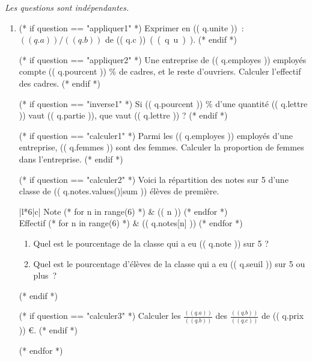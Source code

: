 \exercice

\emph{Les questions sont indépendantes.}

\begin{enumerate}
  (* for question in questions *)
  (* set q=questions[question] *)
  \item %

    (* if question == "appliquer1" *)
    Exprimer en (( q.unite )) : $(( q.a ))/(( q.b ))$ de \SI{(( q.c ))}{(( q.u ))}.
    (* endif *)

    (* if question == "appliquer2" *)
    Une entreprise de (( q.employes )) employés compte (( q.pourcent )) \% de cadres, et le reste d'ouvriers. Calculer l'effectif des cadres.
    (* endif *)

    (* if question == "inverse1" *)
    Si (( q.pourcent )) \% d'une quantité (( q.lettre )) vaut (( q.partie )), que vaut (( q.lettre )) ?
    (* endif *)

    (* if question == "calculer1" *)
    Parmi les (( q.employes )) employés d'une entreprise, (( q.femmes )) sont des femmes. Calculer la proportion de femmes dans l'entreprise.
    (* endif *)

    (* if question == "calculer2" *)
    Voici la répartition des notes sur 5 d'une classe de (( q.notes.values()|sum )) élèves de première.

      \begin{center}\begin{tabular}{|l*{6}{|c}|}
          \hline
          Note (* for n in range(6) *) & (( n )) (* endfor *) \\
          \hline
          Effectif (* for n in range(6) *) & (( q.notes[n] )) (* endfor *) \\
          \hline
      \end{tabular}\end{center}

      \begin{enumerate}
        \item Quel est le pourcentage de la classe qui a eu (( q.note )) sur 5 ?
        \item Quel est le pourcentage d'élèves de la classe qui a eu (( q.seuil )) sur 5 ou plus ?
        \end{enumerate}
    (* endif *)

    (* if question == "calculer3" *)
    Calculer les $\frac{(( q.a ))}{(( q.b ))}$ des $\frac{(( q.b ))}{(( q.c ))}$ de (( q.prix )) €.
    (* endif *)

(* endfor *)
\end{enumerate}

